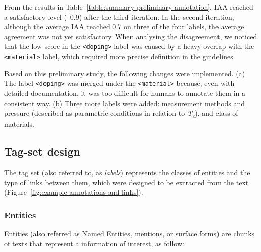 \documentclass[fleqn,10pt]{wlscirep}
\begin{document}
From the results in Table~\ref{table:summary-preliminary-annotation}, IAA reached a satisfactory level (~0.9) after the third iteration. 
In the second iteration, although the average IAA reached 0.7 on three of the four labels, the average agreement was not yet satisfactory. 
When analysing the disagreement, we noticed that the low score in the \texttt{<doping>} label was caused by a heavy overlap with the \texttt{<material>} label, which required more precise definition in the guidelines. 

Based on this preliminary study, the following changes were implemented. 
(a) The label \texttt{<doping>} was merged under the \texttt{<material>} because, even with detailed documentation, it was too difficult for humans to annotate them in a consistent way.
(b) Three more labels were added: measurement methods and pressure (described as parametric conditions in relation to \textit{T\textsubscript{c}}), and class of materials. 

\subsection*{Tag-set design}
The tag set (also referred to, as \textit{labels}) represents the classes of entities and the type of links between them, which were designed to be extracted from the text (Figure~\ref{fig:example-annotations-and-links}).

\subsubsection*{Entities}
Entities (also referred as Named Entities, mentions, or surface forms) are chunks of texts that represent a information of interest, as follow: 
\end{document}
